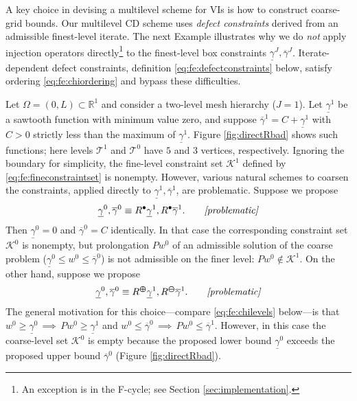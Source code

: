 \documentclass[review,hidelinks,onefignum,onetabnum]{siamart220329}
\newcommand{\RR}{\mathbb{R}}
\newcommand{\maxR}{R^{\bm{\oplus}}}
\newcommand{\minR}{R^{\bm{\ominus}}}
\newcommand{\iR}{R^{\bullet}}
\begin{document}
A key choice in devising a multilevel scheme for VIs is how to construct coarse-grid bounds.
Our multilevel CD scheme uses \emph{defect constraints} \cite{GraeserKornhuber2009} derived from an admissible finest-level iterate.  The next Example illustrates why we do \emph{not} apply injection operators directly\footnote{An exception is in the F-cycle; see Section \ref{sec:implementation}.} to the finest-level box constraints $\underline{\gamma}^J,\overline{\gamma}^J$.  Iterate-dependent defect constraints, definition \eqref{eq:fe:defectconstraints} below, satisfy ordering \eqref{eq:fe:chiordering} and bypass these difficulties.

\begin{example}  \label{ex:directRbad}  
Let $\Omega = (0,L) \subset \RR^1$ and consider a two-level mesh hierarchy ($J=1$).  Let $\underline{\gamma}^1$ be a sawtooth function with minimum value zero, and suppose $\overline{\gamma}^1=C+\underline{\gamma}^1$ with $C>0$ strictly less than the maximum of $\underline{\gamma}^1$.  Figure \ref{fig:directRbad} shows such functions; here levels $\mathcal{T}^1$ and $\mathcal{T}^0$ have $5$ and $3$ vertices, respectively.  Ignoring the boundary for simplicity, the fine-level constraint set $\mathcal{K}^1$ defined by \eqref{eq:fe:fineconstraintset} is nonempty.  However, various natural schemes to coarsen the constraints, applied directly to $\underline{\gamma}^1,\overline{\gamma}^1$, are problematic.  Suppose we propose
\begin{equation}
    \label{eq:fe:badstandard}
    \underline{\gamma}^0, \overline{\gamma}^0 \equiv \iR \underline{\gamma}^1, \iR \overline{\gamma}^1. \qquad \text{\emph{[problematic]}}
\end{equation}
Then $\underline{\gamma}^0=0$ and $\overline{\gamma}^0=C$ identically.  In that case the corresponding constraint set $\mathcal{K}^0$ is nonempty, but prolongation $Pw^0$ of an admissible solution of the coarse problem ($\underline{\gamma}^0 \le w^0 \le \overline{\gamma}^0$) is not admissible on the finer level: $Pw^0 \notin \mathcal{K}^1$.  On the other hand, suppose we propose
\begin{equation}
    \label{eq:fe:badmonotone}
    \underline{\gamma}^0, \overline{\gamma}^0 \equiv \maxR \underline{\gamma}^1, \minR \overline{\gamma}^1. \qquad \text{\emph{[problematic]}}
\end{equation}
The general motivation for this choice---compare \eqref{eq:fe:chilevels} below---is that $w^0 \ge \underline{\gamma}^0 \, \implies \, Pw^0 \ge \underline{\gamma}^1$ and $w^0 \le \overline{\gamma}^0 \, \implies \, Pw^0 \le \overline{\gamma}^1$.  However, in this case the coarse-level set $\mathcal{K}^0$ is empty because the proposed lower bound $\underline{\gamma}^0$ exceeds the proposed upper bound $\overline{\gamma}^0$ (Figure \ref{fig:directRbad}).
\end{example}
\end{document}
